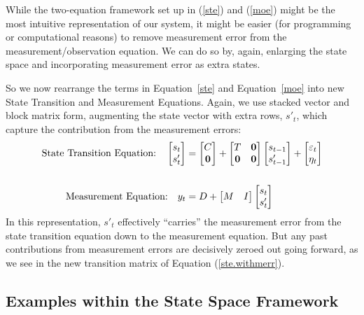 \documentclass[a4paper,12pt]{article}
\begin{document}
While the two-equation framework set up in (\ref{ste}) and (\ref{moe})
might be the most intuitive representation of our system, it might be
easier (for programming or computational reasons) to remove measurement
error from the measurement/observation equation. We can do so by, again,
enlarging the state space and incorporating measurement error as extra
states.

So we now rearrange the terms in Equation~\ref{ste} and
Equation~\ref{moe} into new State Transition and Measurement Equations.
Again, we use stacked vector and block matrix form, augmenting the state
vector with extra rows, $s'_t$, which capture the contribution from the
measurement errors:
\begin{align}
  \text{State Transition Equation:} \quad
    \begin{bmatrix} s_{t} \\ s'_t \end{bmatrix}
    &= \begin{bmatrix} C \\ \mathbf{0} \end{bmatrix}
    + \begin{bmatrix} T & \mathbf{0} \\ 
    \mathbf{0} & \mathbf{0} \end{bmatrix}
    \begin{bmatrix} s_{t-1} \\ s'_{t-1} \end{bmatrix}
    + \begin{bmatrix} \varepsilon_{t} \\ \eta_t \end{bmatrix}
    \label{ste.withmerr}
  \\ \notag \\
  \text{Measurement Equation:} \quad
    y_{t} &= D + 
    \begin{bmatrix} M & I \end{bmatrix}
    \begin{bmatrix} s_{t} \\ s'_t \end{bmatrix}
\end{align}
In this representation, $s'_t$ effectively ``carries'' the measurement error from the state transition equation down to the measurement equation. But any past contributions from measurement errors are decisively zeroed out going forward, as we see in the new transition matrix of Equation (\ref{ste.withmerr}).


\subsection{Examples within the State Space Framework}
\end{document}

